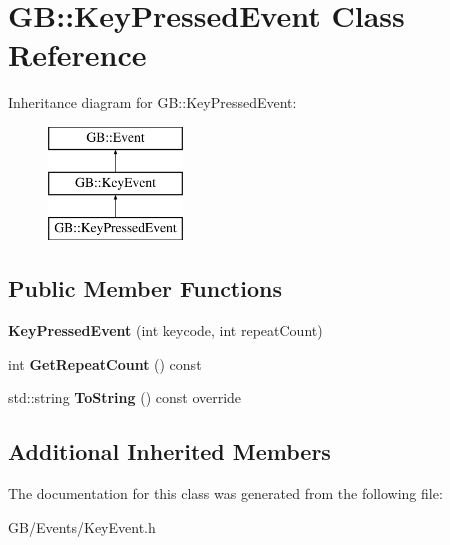 \hypertarget{class_g_b_1_1_key_pressed_event}{}\section{GB\+::Key\+Pressed\+Event Class Reference}
\label{class_g_b_1_1_key_pressed_event}
Inheritance diagram for GB\+::Key\+Pressed\+Event\+:\begin{figure}[H]
\begin{center}
\leavevmode
\includegraphics[height=3.000000cm]{class_g_b_1_1_key_pressed_event}
\end{center}
\end{figure}
\subsection*{Public Member Functions}
\begin{DoxyCompactItemize}
\item 
\mbox{\label{class_g_b_1_1_key_pressed_event_adaab3a1c217044c493d696e38c108c95}} 
{\bfseries Key\+Pressed\+Event} (int keycode, int repeat\+Count)
\item 
\mbox{\label{class_g_b_1_1_key_pressed_event_a2d9598bd8c66797fbb6299a2047eee11}} 
int {\bfseries Get\+Repeat\+Count} () const
\item 
\mbox{\label{class_g_b_1_1_key_pressed_event_a980ffa151220663d8f4414a5599827c0}} 
std\+::string {\bfseries To\+String} () const override
\end{DoxyCompactItemize}
\subsection*{Additional Inherited Members}


The documentation for this class was generated from the following file\+:\begin{DoxyCompactItemize}
\item 
G\+B/\+Events/Key\+Event.\+h\end{DoxyCompactItemize}
